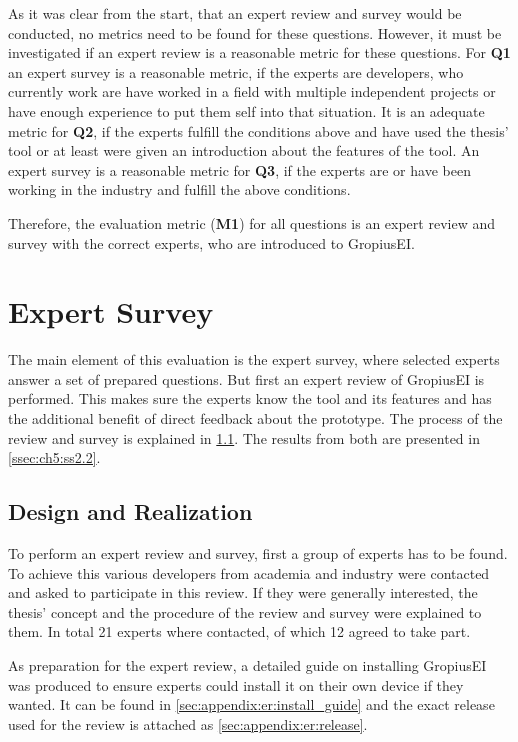 As it was clear from the start, that an expert review and survey would be conducted, no metrics need to be found for these questions.
However, it must be investigated if an expert review is a reasonable metric for these questions.
For \textbf{Q1} an expert survey is a reasonable metric, if the experts are developers, who currently work are have worked in a field with multiple independent projects or have enough experience to put them self into that situation.
It is an adequate metric for \textbf{Q2}, if the experts fulfill the conditions above and have used the thesis' tool or at least were given an introduction about the features of the tool.
An expert survey is a reasonable metric for \textbf{Q3}, if the experts are or have been working in the industry and fulfill the above conditions.

Therefore, the evaluation metric (\textbf{M1}) for all questions is an expert review and survey with the correct experts, who are introduced to \gls{GropiusEI}. 

\section{Expert Survey}
\label{sec:ch5:s2}
The main element of this evaluation is the expert survey, where selected experts answer a set of prepared questions. 
But first an expert review of \gls{GropiusEI} is performed.
This makes sure the experts know the tool and its features and has the additional benefit of direct feedback about the prototype.
The process of the review and survey is explained in \cref{ssec:ch5:ss2.1}.
The results from both are presented in \cref{ssec:ch5:ss2.2}.

\subsection{Design and Realization}
\label{ssec:ch5:ss2.1}
To perform an expert review and survey, first a group of experts has to be found.
To achieve this various developers from academia and industry were contacted and asked to participate in this review.
If they were generally interested, the thesis' concept and the procedure of the review and survey were explained to them.
In total 21 experts where contacted, of which 12 agreed to take part.

As preparation for the expert review, a detailed guide on installing \gls{GropiusEI} was produced
to ensure experts could install it on their own device if they wanted.
It can be found in \cref{sec:appendix:er:install_guide} and
the exact release used for the review is attached as \cref{sec:appendix:er:release}.

